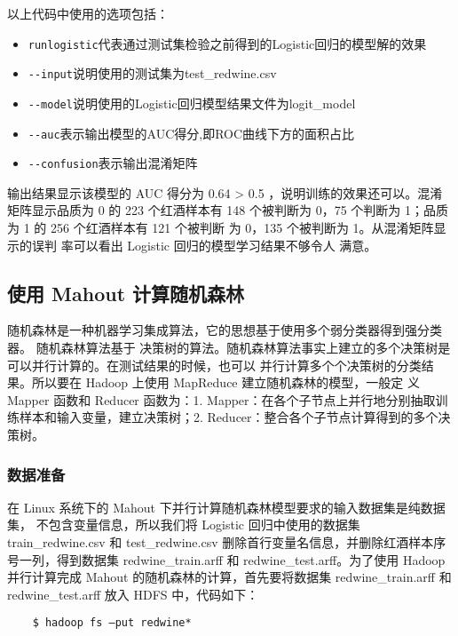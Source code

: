 以上代码中使用的选项包括：

\begin{itemize}
\item
  \lstinline!runlogistic!代表通过测试集检验之前得到的Logistic回归的模型解的效果
\item
  \lstinline!--input!说明使用的测试集为test\_redwine.csv
\item
  \lstinline!--model!说明使用的Logistic回归模型结果文件为logit\_model
\item
  \lstinline!--auc!表示输出模型的AUC得分,即ROC曲线下方的面积占比
\item
  \lstinline!--confusion!表示输出混淆矩阵
\end{itemize}

输出结果显示该模型的 AUC 得分为 0.64 \textgreater{} 0.5
，说明训练的效果还可以。混淆矩阵显示品质为 0 的 223 个红酒样本有 148
个被判断为 0，75 个判断为 1；品质 为 1 的 256 个红酒样本有 121 个被判断 为
0，135 个被判断为 1。从混淆矩阵显示的误判 率可以看出 Logistic
回归的模型学习结果不够令人 满意。

\subsection{使用 Mahout
计算随机森林}\label{ux4f7fux7528-mahout-ux8ba1ux7b97ux968fux673aux68eeux6797}

随机森林是一种机器学习集成算法，它的思想基于使用多个弱分类器得到强分类器。
随机森林算法基于
决策树的算法。随机森林算法事实上建立的多个决策树是可以并行计算的。在测试结果的时候，也可以
并行计算多个个决策树的分类结果。所以要在 Hadoop 上使用 MapReduce
建立随机森林的模型，一般定 义 Mapper 函数和 Reducer 函数为：1.
Mapper：在各个子节点上并行地分别抽取训练样本和输入变量，建立决策树；2.
Reducer：整合各个子节点计算得到的多个决策树。

\subsubsection{数据准备}\label{ux6570ux636eux51c6ux5907-1}

在 Linux 系统下的 Mahout
下并行计算随机森林模型要求的输入数据集是纯数据集，
不包含变量信息，所以我们将 Logistic 回归中使用的数据集 train\_redwine.csv
和 test\_redwine.csv
删除首行变量名信息，并删除红酒样本序号一列，得到数据集 redwine\_train.arff
和 redwine\_test.arff。为了使用 Hadoop 并行计算完成 Mahout
的随机森林的计算，首先要将数据集 redwine\_train.arff 和
redwine\_test.arff 放入 HDFS 中，代码如下：

\begin{lstlisting}
	$ hadoop fs –put redwine*
\end{lstlisting}

